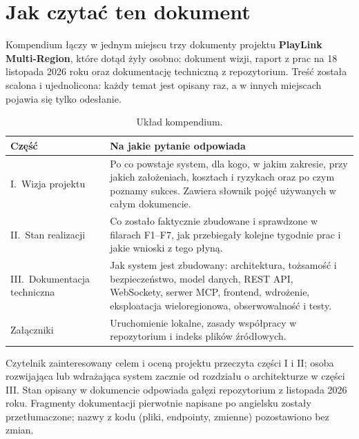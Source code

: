 \chapter*{Jak czytać ten dokument}

Kompendium łączy w jednym miejscu trzy dokumenty projektu \textbf{PlayLink Multi-Region}, które
dotąd żyły osobno: dokument wizji, raport z prac na 18 listopada 2026 roku oraz dokumentację techniczną
z repozytorium. Treść została scalona i ujednolicona: każdy temat jest opisany raz, a w innych
miejscach pojawia się tylko odesłanie.

\begin{table}[H]
\centering\small
\renewcommand{\arraystretch}{1.25}
\begin{tabularx}{\textwidth}{@{}p{}Y@{}}
\toprule
\textbf{Część} & \textbf{Na jakie pytanie odpowiada} \\
\midrule
I.\ Wizja projektu & Po co powstaje system, dla kogo, w jakim zakresie, przy jakich założeniach, kosztach i ryzykach oraz po czym poznamy sukces. Zawiera słownik pojęć używanych w całym dokumencie. \\
II.\ Stan realizacji & Co zostało faktycznie zbudowane i sprawdzone w filarach F1--F7, jak przebiegały kolejne tygodnie prac i jakie wnioski z tego płyną. \\
III.\ Dokumentacja techniczna & Jak system jest zbudowany: architektura, tożsamość i bezpieczeństwo, model danych, REST API, WebSockety, serwer MCP, frontend, wdrożenie, eksploatacja wieloregionowa, obserwowalność i testy. \\
Załączniki & Uruchomienie lokalne, zasady współpracy w repozytorium i indeks plików źródłowych. \\
\bottomrule
\end{tabularx}
\caption{Układ kompendium.}
\end{table}

Czytelnik zainteresowany celem i oceną projektu przeczyta części I i II; osoba rozwijająca lub
wdrażająca system zacznie od rozdziału o architekturze w części III. Stan opisany w dokumencie
odpowiada gałęzi  repozytorium z listopada 2026 roku. Fragmenty dokumentacji pierwotnie
napisane po angielsku zostały przetłumaczone; nazwy z kodu (pliki, endpointy, zmienne) pozostawiono
bez zmian.
